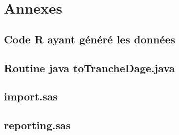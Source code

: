 \chapter{Annexes}
\section{Code R ayant généré les données}\label{generateDataR}
\lstset{language=java}
\lstset{frame=shadowbox}


\clearpage

\section{Routine java toTrancheDage.java}\label{toTrancheDage}

\lstset{language=java}
\lstset{frame=shadowbox}


\section{import.sas}\label{import.sas}

\lstset{language=sql}
\lstset{frame=shadowbox}


\section{reporting.sas}\label{reporting.sas}

\lstset{language=sql}
\lstset{frame=shadowbox}


